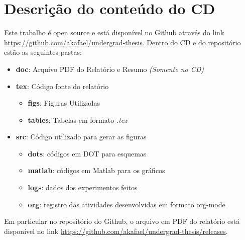 \chapter{Descrição do conteúdo do CD}

\label{AnCD}

Este trabalho é open source e está disponível no Github através do link \url{https://github.com/akafael/undergrad-thesis}. Dentro do CD e do repositório estão as seguintes pastas:

\begin{itemize}
    \item \textbf{doc}: Arquivo PDF do Relatório e Resumo \textit{(Somente no CD)}
    \item \textbf{tex}: Código fonte do relatório
    \begin{itemize}
        \item \textbf{figs}: Figuras Utilizadas
        \item \textbf{tables}: Tabelas em formato \textit{.tex}
    \end{itemize}
    \item \textbf{src}: Código utilizado para gerar as figuras
    \begin{itemize}
        \item \textbf{dots}: códigos em DOT para esquemas
        \item \textbf{matlab}: códigos em Matlab para os gráficos
        \item \textbf{logs}: dados dos experimentos feitos
        \item \textbf{org}: registro das atividades desenvolvidas em formato org-mode
        \end{itemize}
\end{itemize}

Em particular no repositório do Github, o arquivo em PDF do relatório está disponível no link \url{https://github.com/akafael/undergrad-thesis/releases}.

